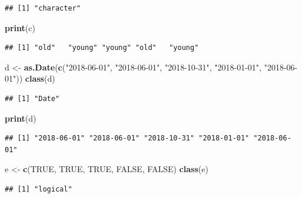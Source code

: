 \documentclass[]{book}
\newenvironment{Shaded}{\begin{snugshade}}{\end{snugshade}}
\newcommand{\KeywordTok}[1]{\textcolor[rgb]{0.13,0.29,0.53}{\textbf{#1}}}
\newcommand{\StringTok}[1]{\textcolor[rgb]{0.31,0.60,0.02}{#1}}
\newcommand{\OtherTok}[1]{\textcolor[rgb]{0.56,0.35,0.01}{#1}}
\newcommand{\NormalTok}[1]{#1}
\begin{document}
\begin{verbatim}
## [1] "character"
\end{verbatim}

\begin{Shaded}
\begin{Highlighting}[]
\KeywordTok{print}\NormalTok{(c)}
\end{Highlighting}
\end{Shaded}

\begin{verbatim}
## [1] "old"   "young" "young" "old"   "young"
\end{verbatim}

\begin{Shaded}
\begin{Highlighting}[]
\NormalTok{d <-}\StringTok{ }\KeywordTok{as.Date}\NormalTok{(}\KeywordTok{c}\NormalTok{(}\StringTok{"2018-06-01"}\NormalTok{, }\StringTok{"2018-06-01"}\NormalTok{, }\StringTok{"2018-10-31"}\NormalTok{, }\StringTok{"2018-01-01"}\NormalTok{, }\StringTok{"2018-06-01"}\NormalTok{))}
\KeywordTok{class}\NormalTok{(d)}
\end{Highlighting}
\end{Shaded}

\begin{verbatim}
## [1] "Date"
\end{verbatim}

\begin{Shaded}
\begin{Highlighting}[]
\KeywordTok{print}\NormalTok{(d)}
\end{Highlighting}
\end{Shaded}

\begin{verbatim}
## [1] "2018-06-01" "2018-06-01" "2018-10-31" "2018-01-01" "2018-06-01"
\end{verbatim}

\begin{Shaded}
\begin{Highlighting}[]
\NormalTok{e <-}\StringTok{ }\KeywordTok{c}\NormalTok{(}\OtherTok{TRUE}\NormalTok{, }\OtherTok{TRUE}\NormalTok{, }\OtherTok{TRUE}\NormalTok{, }\OtherTok{FALSE}\NormalTok{, }\OtherTok{FALSE}\NormalTok{)}
\KeywordTok{class}\NormalTok{(e)}
\end{Highlighting}
\end{Shaded}

\begin{verbatim}
## [1] "logical"
\end{verbatim}
\end{document}
